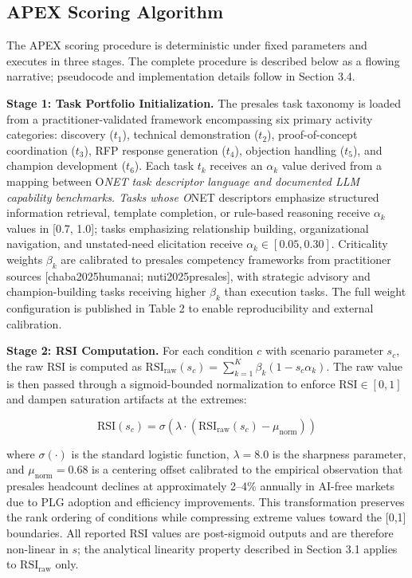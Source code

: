 \documentclass[10pt, conference]{IEEEtran}
\begin{document}
\subsection{APEX Scoring Algorithm}

\label{sec:apex_scoring_algorithm}

The APEX scoring procedure is deterministic under fixed parameters and executes in three stages. The complete procedure is described below as a flowing narrative; pseudocode and implementation details follow in Section 3.4.

\textbf{Stage 1: Task Portfolio Initialization.} The presales task taxonomy is loaded from a practitioner-validated framework encompassing six primary activity categories: discovery ($t_1$), technical demonstration ($t_2$), proof-of-concept coordination ($t_3$), RFP response generation ($t_4$), objection handling ($t_5$), and champion development ($t_6$). Each task $t_k$ receives an $\alpha_k$ value derived from a mapping between O\textit{NET task descriptor language and documented LLM capability benchmarks. Tasks whose O}NET descriptors emphasize structured information retrieval, template completion, or rule-based reasoning receive $\alpha_k$ values in [0.7, 1.0]; tasks emphasizing relationship building, organizational navigation, and unstated-need elicitation receive $\alpha_k \in [0.05, 0.30]$. Criticality weights $\beta_k$ are calibrated to presales competency frameworks from practitioner sources [chaba2025humanai; nuti2025presales], with strategic advisory and champion-building tasks receiving higher $\beta_k$ than execution tasks. The full weight configuration is published in Table 2 to enable reproducibility and external calibration.

\textbf{Stage 2: RSI Computation.} For each condition $c$ with scenario parameter $s_c$, the raw RSI is computed as $\text{RSI}_{\text{raw}}(s_c) = \sum_{k=1}^{K} \beta_k (1 - s_c \alpha_k)$. The raw value is then passed through a sigmoid-bounded normalization to enforce $\text{RSI} \in [0,1]$ and dampen saturation artifacts at the extremes:

\begin{equation}
\text{RSI}(s_c) = \sigma\!\left(\lambda \cdot \left(\text{RSI}_{\text{raw}}(s_c) - \mu_{\text{norm}}\right)\right)
\end{equation}

where $\sigma(\cdot)$ is the standard logistic function, $\lambda = 8.0$ is the sharpness parameter, and $\mu_{\text{norm}} = 0.68$ is a centering offset calibrated to the empirical observation that presales headcount declines at approximately 2--4\% annually in AI-free markets due to PLG adoption and efficiency improvements. This transformation preserves the rank ordering of conditions while compressing extreme values toward the [0,1] boundaries. All reported RSI values are post-sigmoid outputs and are therefore non-linear in $s$; the analytical linearity property described in Section 3.1 applies to $\text{RSI}_{\text{raw}}$ only.
\end{document}
